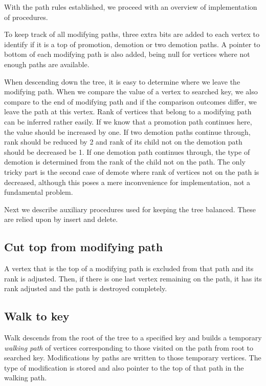With the path rules established, we proceed with an overview of implementation of procedures.

To keep track of all modifying paths, three extra bits are added to each vertex to identify if it is a top of promotion, demotion or two demotion paths. A pointer to bottom of each modifying path is also added, being null for vertices where not enough paths are available.

When descending down the tree, it is easy to determine where we leave the modifying path. When we compare the value of a vertex to searched key, we also compare to the end of modifying path and if the comparison outcomes differ, we leave the path at this vertex. Rank of vertices that belong to a modifying path can be inferred rather easily. If we know that a promotion path continues here, the value should be increased by one. If two demotion paths continue through, rank should be reduced by 2 and rank of its child not on the demotion path should be decreased be 1. If one demotion path continues through, the type of demotion is determined from the rank of the child not on the path. The only tricky part is the second case of demote where rank of vertices not on the path is decreased, although this poses a mere inconvenience for implementation, not a fundamental problem.

Next we describe auxiliary procedures used for keeping the tree balanced. These are relied upon by insert and delete.

\subsection{Cut top from modifying path}

A vertex that is the top of a modifying path is excluded from that path and its rank is adjusted. Then, if there is one last vertex remaining on the path, it has its rank adjusted and the path is destroyed completely.

\subsection{Walk to key}

Walk descends from the root of the tree to a specified key and builds a temporary {\em walking path} of vertices corresponding to those visited on the path from root to searched key. Modifications by paths are written to those temporary vertices. The type of modification is stored and also pointer to the top of that path in the walking path.

